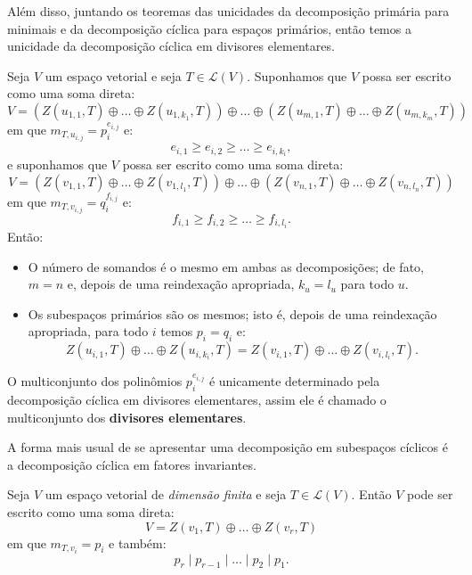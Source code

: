 \documentclass[11pt,twoside,a4paper]{book}
\begin{document}
\noindent
Além disso, juntando os teoremas das unicidades da decomposição primária para minimais e da decomposição cíclica para espaços primários, então temos a unicidade da decomposição cíclica em divisores elementares.

\begin{teorema}
Seja $V$ um espaço vetorial e seja $T\in\mathcal{L}(V)$. Suponhamos que $V$ possa ser escrito como uma soma direta:
\[
V=\left(Z(u_{1,1},T)\oplus\dots\oplus Z(u_{1,k_1},T)\right)\oplus\dots\oplus\left(Z(u_{m,1},T)\oplus\dots\oplus Z(u_{m,k_m},T)\right)
\]
em que $m_{T,u_{i,j}}=p_i^{e_{i,j}}$ e:
\[
e_{i,1}\geq e_{i,2}\geq\dots\geq e_{i,k_i},
\]
e suponhamos que $V$ possa ser escrito como uma soma direta:
\[
V=\left(Z(v_{1,1},T)\oplus\dots\oplus Z(v_{1,l_1},T)\right)\oplus\dots\oplus\left(Z(v_{n,1},T)\oplus\dots\oplus Z(v_{n,l_n},T)\right)
\]
em que $m_{T,v_{i,j}}=q_i^{f_{i,j}}$ e:
\[
f_{i,1}\geq f_{i,2}\geq\dots\geq f_{i,l_i}.
\]
Então:
\begin{itemize}
\item O número de somandos é o mesmo em ambas as decomposições; de fato,
$m=n$ e, depois de uma reindexação apropriada, $k_u=l_u$ para todo $u$.
\item Os subespaços primários são os mesmos; isto é, depois de uma reindexação apropriada, para todo $i$ temos $p_i=q_i$ e:
\[
Z(u_{i,1},T)\oplus\dots\oplus Z(u_{i,k_i},T)=Z(v_{i,1},T)\oplus\dots\oplus Z(v_{i,l_i},T).
\]
\end{itemize}
\end{teorema}

\begin{definicao}
O multiconjunto dos polinômios $p_i^{e_{i,j}}$ é unicamente determinado pela decomposição cíclica em divisores elementares, assim ele é chamado o multiconjunto dos \textbf{divisores elementares}.
\end{definicao}

\noindent
A forma mais usual de se apresentar uma decomposição em subespaços cíclicos é a decomposição cíclica em fatores invariantes.

\begin{teorema}
Seja $V$ um espaço vetorial de \emph{dimensão finita} e seja $T\in\mathcal{L}(V)$. Então $V$ pode ser escrito como uma soma direta:
\[
V=Z(v_1,T)\oplus\dots\oplus Z(v_r,T)
\]
em que $m_{T,v_i}=p_i$ e também:
\[
p_r\mid p_{r-1}\mid\dots\mid p_2\mid p_1.
\]
\end{teorema}
\end{document}
